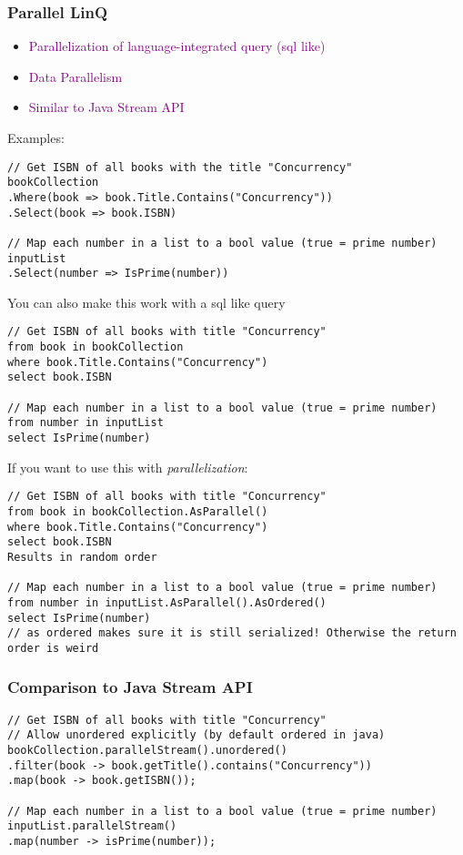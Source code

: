\documentclass[main.tex,fontsize=8pt,paper=a4,paper=portrait,DIV=calc,]{scrartcl}
\begin{document}
\subsubsection{Parallel LinQ}
\begin{itemize}
\item \textcolor{purple}{Parallelization of language-integrated query (sql like)}
\item \textcolor{purple}{Data Parallelism}
\item \textcolor{purple}{Similar to Java Stream API}
\end{itemize} 
Examples: 
\begin{lstlisting}
// Get ISBN of all books with the title "Concurrency"
bookCollection
.Where(book => book.Title.Contains("Concurrency"))
.Select(book => book.ISBN)

// Map each number in a list to a bool value (true = prime number)
inputList
.Select(number => IsPrime(number))
\end{lstlisting}
You can also make this work with a sql like query 
\begin{lstlisting}
// Get ISBN of all books with title "Concurrency"
from book in bookCollection
where book.Title.Contains("Concurrency")
select book.ISBN

// Map each number in a list to a bool value (true = prime number)
from number in inputList
select IsPrime(number)
\end{lstlisting}
If you want to use this with \emph{parallelization}: 
\begin{lstlisting}
// Get ISBN of all books with title "Concurrency"
from book in bookCollection.AsParallel()
where book.Title.Contains("Concurrency")
select book.ISBN
Results in random order

// Map each number in a list to a bool value (true = prime number)
from number in inputList.AsParallel().AsOrdered()
select IsPrime(number)
// as ordered makes sure it is still serialized! Otherwise the return order is weird
\end{lstlisting}

\lstset{
    language=Java,
    style=code,
}

\subsubsection{Comparison to Java Stream API}
\begin{lstlisting}
// Get ISBN of all books with title "Concurrency"
// Allow unordered explicitly (by default ordered in java)
bookCollection.parallelStream().unordered()
.filter(book -> book.getTitle().contains("Concurrency"))
.map(book -> book.getISBN());

// Map each number in a list to a bool value (true = prime number)
inputList.parallelStream()
.map(number -> isPrime(number));
\end{lstlisting}
\end{document}
